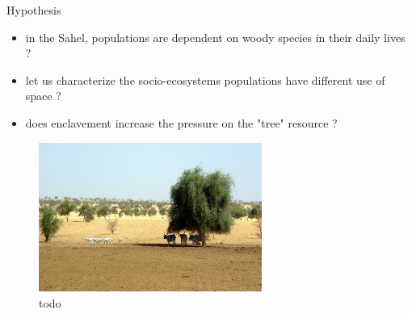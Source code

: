 \documentclass[newPxFont]{beamer}
\begin{document}
%
%

\begin{frame}[c]{Hypothesis}
\vspace{-1cm}
\begin{itemize}
  \item in the Sahel, populations are dependent on woody species in their daily lives ?
  \item let us characterize the socio-ecosystems populations have different use of space ?
  \item does enclavement increase the pressure on the "tree" resource ?
\end{itemize}
\begin{figure}
	\centering
	\includegraphics[width = 0.65\textwidth]{img/2007-11-05_Podor_3733.JPG}
	\caption{todo}
\end{figure}
\end{frame}
\end{document}
